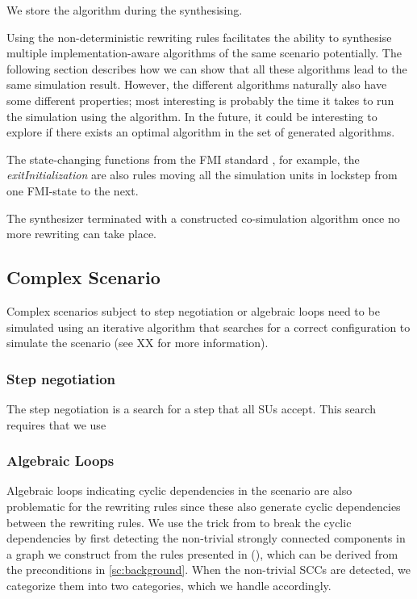 We store the algorithm during the synthesising.

Using the non-deterministic rewriting rules facilitates the ability to synthesise multiple implementation-aware algorithms of the same scenario potentially.
The following section describes how we can show that all these algorithms lead to the same simulation result.
However, the different algorithms naturally also have some different properties; most interesting is probably the time it takes to run the simulation using the algorithm. 
In the future, it could be interesting to explore if there exists an optimal algorithm in the set of generated algorithms.

The state-changing functions from the FMI standard \cite{FMI2014}, for example, the \textit{exitInitialization} are also rules moving all the simulation units in lockstep from one FMI-state to the next.

The synthesizer terminated with a constructed co-simulation algorithm once no more rewriting can take place.

\subsection{Complex Scenario}
Complex scenarios subject to step negotiation or algebraic loops need to be simulated using an iterative algorithm that searches for a correct configuration to simulate the scenario (see XX for more information).

\subsubsection{Step negotiation}
The step negotiation is a search for a step that all SUs accept.
This search requires that we use


\subsubsection{Algebraic Loops}
Algebraic loops indicating cyclic dependencies in the scenario are also problematic for the rewriting rules since these also generate cyclic dependencies between the rewriting rules. 
We use the trick from \cite{thrane2021} to break the cyclic dependencies by first detecting the non-trivial strongly connected components in a graph we construct from the rules presented in (), which can be derived from the preconditions in \cref{sc:background}.
When the non-trivial SCCs are detected, we categorize them into two categories, which we handle accordingly.




